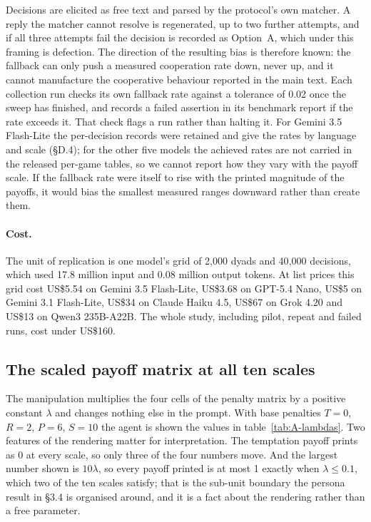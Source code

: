 \documentclass[11pt,a4paper]{article}
\newcommand{\lam}{\lambda}
\newcommand{\rev}[1]{{\color{red}#1}}
\newcommand{\rev}[1]{#1}
\begin{document}
Decisions are elicited as free text and parsed by the protocol's own matcher. A reply the matcher cannot resolve is regenerated, up to two further attempts, and if all three attempts fail the decision is recorded as Option~A, which under this framing is defection. The direction of the resulting bias is therefore known: the fallback can only push a measured cooperation rate down, never up, and it cannot manufacture the cooperative behaviour reported in the main text. Each collection run checks its own fallback rate against a tolerance of 0.02 once the sweep has finished, and records a failed assertion in its benchmark report if the rate exceeds it. That check flags a run rather than halting it. \rev{For Gemini 3.5 Flash-Lite the per-decision records were retained and give the rates by language and scale (\S D.4); for the other five models} the achieved rates are not carried in the released per-game tables, so we cannot report how they vary with the payoff scale. If the fallback rate were itself to rise with the printed magnitude of the payoffs, it would bias the smallest measured ranges downward rather than create them.

\rev{\paragraph{Cost.} The unit of replication is one model's grid of 2{,}000 dyads and 40{,}000 decisions, which used 17.8 million input and 0.08 million output tokens. At list prices this grid cost US\$5.54 on Gemini 3.5 Flash-Lite, US\$3.68 on GPT-5.4 Nano, US\$5 on Gemini 3.1 Flash-Lite,  US\$34 on Claude Haiku 4.5, US\$67 on Grok 4.20 and US\$13 on Qwen3 235B-A22B. The whole study, including pilot, repeat and failed runs, cost under US\$160.}

\subsection{The scaled payoff matrix at all ten scales}\label{appendix:payoff_scaling}

The manipulation multiplies the four cells of the penalty matrix by a positive constant $\lam$ and changes nothing else in the prompt. With base penalties $T = 0$, $R = 2$, $P = 6$, $S = 10$ the agent is shown the values in table~\ref{tab:A-lambdas}. Two features of the rendering matter for interpretation. The temptation payoff prints as 0 at every scale, so only three of the four numbers move. And the largest number shown is $10\lam$, so every payoff printed is at most 1 exactly when $\lam \leq 0.1$, which two of the ten scales satisfy; that is the sub-unit boundary the persona result in \S3.4 is organised around, and it is a fact about the rendering rather than a free parameter.
\end{document}
